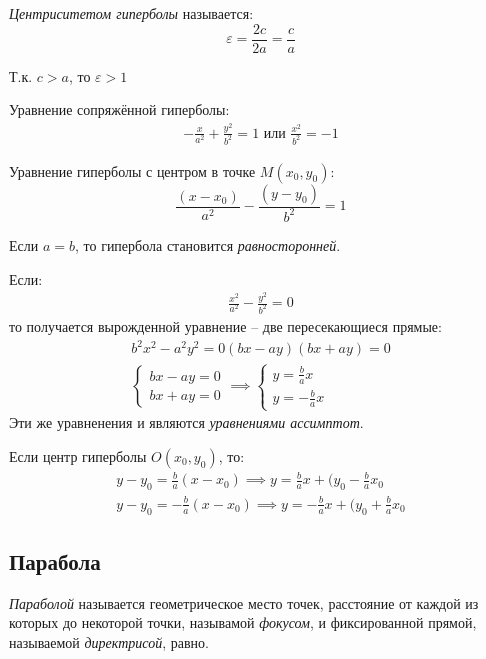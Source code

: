 \textit{Центриситетом гиперболы} называется: \[
\varepsilon = \frac{2c}{2a} = \frac{c}{a}
\] 
\begin{note}
  Т.к. $c > a$, то  $\varepsilon > 1$
\end{note}

\begin{note}
  Уравнение сопряжённой гиперболы:
  \begin{gather*}
    \boxed{-\frac{x}{a^2} + \frac{y^2}{b^2} = 1} \text{ или } \boxed{\frac{x^2}{b^2} = -1} 
  \end{gather*} 

  Уравнение гиперболы с центром в точке $M(x_0, y_0)$: \[
  \frac{(x - x_0)}{a^2} - \frac{(y - y_0)}{b^2} = 1
  \] 

  Если $a = b$, то гипербола становится \textit{равносторонней}.

  Если: 
  \begin{gather*}
    \frac{x^2}{a^2} - \frac{y^2}{b^2} = 0
  \end{gather*}
  то получается вырожденной уравнение -- две пересекающиеся прямые:
  \begin{gather*}
    b^2x^2 - a^2y^2 = 0
    (bx - ay)(bx + ay) = 0 \\
    \begin{cases}
      bx - ay = 0 \\
      bx + ay = 0
    \end{cases} \implies 
    \begin{cases}
      y = \frac{b}{a} x \\
      y = - \frac{b}{a} x
    \end{cases}
  \end{gather*}
  Эти же уравненения и являются \textit{уравнениями ассимптот}. 
  
  Если центр гиперболы $O(x_0, y_0)$, то: 
  \begin{gather*}
  y - y_0 = \frac{b}{a}(x - x_0) \implies y = \frac{b}{a}x + (y_0 - \frac{b}{a}x_0 \\
  y - y_0 = -\frac{b}{a}(x - x_0) \implies y = -\frac{b}{a}x + (y_0 + \frac{b}{a}x_0
  \end{gather*}
\end{note}

\subsection{Парабола}

\begin{definition}
  \textit{Параболой} называется геометрическое место точек, расстояние от каждой из которых до некоторой точки, называмой \textit{фокусом}, и фиксированной прямой, называемой \textit{директрисой}, равно.
\end{definition}

